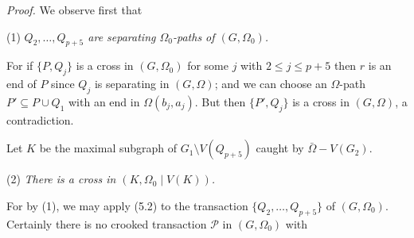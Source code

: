 \textit{Proof.} We observe first that

\hspace*{12pt}(1) \textit{$Q_2, \dots, Q_{p+5}$ are separating $\Omega_0$-paths of $(G, \Omega_0)$.}

For if $\{P, Q_j\}$ is a cross in $(G, \Omega_0)$ for some $j$ with $2 \le j \le p+5$ then $r$ is an end of $P$ since $Q_j$ is separating in $(G, \Omega)$; and we can choose an $\Omega$-path $P' \subseteq P \cup Q_1$ with an end in $\Omega(b_j, a_j)$. But then $\{P', Q_j\}$ is a cross in $(G, \Omega)$, a contradiction.

Let $K$ be the maximal subgraph of $G_1 \setminus V(Q_{p+5})$ caught by $\bar{\Omega} - V(G_2)$.

\hspace*{12pt}(2) \textit{There is a cross in $(K, \Omega_0 \mid V(K))$.}

For by (1), we may apply (5.2) to the transaction $\{Q_2, \dots, Q_{p+5}\}$ of $(G, \Omega_0)$. Certainly there is no crooked transaction $\mathcal{P}$ in $(G, \Omega_0)$ with
